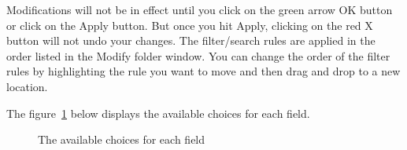 Modifications will not be in effect until you click on the green arrow OK button or click on the Apply button.  
But once you hit Apply, clicking on the red X button will not undo your changes.  
The filter/search rules are applied in the order listed in the Modify folder window.  
You can change the order of the filter rules by highlighting the rule you want to move and then drag and drop to a new location.

The figure~\ref{fig:modify_folder} below displays the available choices for each field.

\begin{figure}[htpb]
    \centering
    \caption{The available choices for each field}
    \label{fig:modify_folder}
\end{figure}

